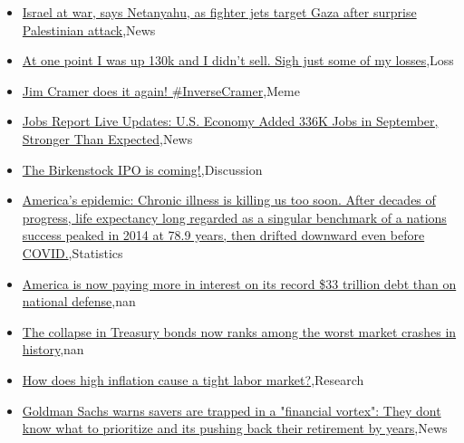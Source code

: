 \documentclass{article}%
\begin{document}
%
\begin{itemize}%
\item%
\href{https://reddit.com/r/wallstreetbets/comments/17247bm/israel\_at\_war\_says\_netanyahu\_as\_fighter\_jets/}{Israel at war, says Netanyahu, as fighter jets target Gaza after surprise Palestinian attack},News%
\item%
\href{https://reddit.com/r/wallstreetbets/comments/171ygo6/at\_one\_point\_i\_was\_up\_130k\_and\_i\_didnt\_sell\_sigh/}{At one point I was up 130k and I didn't sell. Sigh just some of my losses},Loss%
\item%
\href{https://reddit.com/r/StockMarket/comments/171ds0p/jim\_cramer\_does\_it\_again\_inversecramer/}{Jim Cramer does it again! \#InverseCramer},Meme%
\item%
\href{https://reddit.com/r/StockMarket/comments/171bakh/jobs\_report\_live\_updates\_us\_economy\_added\_336k/}{Jobs Report Live Updates: U.S. Economy Added 336K Jobs in September, Stronger Than Expected},News%
\item%
\href{https://reddit.com/r/StockMarket/comments/171a10r/the\_birkenstock\_ipo\_is\_coming/}{The Birkenstock IPO is coming!},Discussion%
\item%
\href{https://reddit.com/r/Economics/comments/171x6cl/americas\_epidemic\_chronic\_illness\_is\_killing\_us/}{America's epidemic: Chronic illness is killing us too soon. After decades of progress, life expectancy  long regarded as a singular benchmark of a nations success  peaked in 2014 at 78.9 years, then drifted downward even before COVID.},Statistics%
\item%
\href{https://reddit.com/r/Economics/comments/171rhpw/america\_is\_now\_paying\_more\_in\_interest\_on\_its/}{America is now paying more in interest on its record \$33 trillion debt than on national defense},nan%
\item%
\href{https://reddit.com/r/Economics/comments/171rgja/the\_collapse\_in\_treasury\_bonds\_now\_ranks\_among/}{The collapse in Treasury bonds now ranks among the worst market crashes in history},nan%
\item%
\href{https://reddit.com/r/Economics/comments/171l7dg/how\_does\_high\_inflation\_cause\_a\_tight\_labor\_market/}{How does high inflation cause a tight labor market?},Research%
\item%
\href{https://reddit.com/r/Economics/comments/171gsnk/goldman\_sachs\_warns\_savers\_are\_trapped\_in\_a/}{Goldman Sachs warns savers are trapped in a "financial vortex": They dont know what to prioritize and its pushing back their retirement by years},News%
\end{itemize}%
\end{document}

